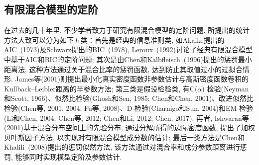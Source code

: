 \documentclass[a4paper,12pt,openany,oneside,utf-8]{ctexbook}
\begin{document}
\subsection{有限混合模型的定阶}
在过去的几十年里, 不少学者致力于研究有限混合模型的定阶问题. 所提出的统计方法大致可以分为如下五类：首先是经典的信息准则类, 如Akaike提出的AIC~(1973)及Schwarz提出的BIC~(1978), Leroux~(1992)讨论了经典有限混合模型中基于AIC和BIC的定阶问题; 其次是由Chen和Kalbfleisch~(1996)提出的惩罚最小距离法, 这种方法通过关于混合比率的惩罚函数, 达到防止其取值过小的过拟合情形. James等(2001)则提出最小化真实密度函数非参数估计与高斯密度函数卷积的Kullback–Leibler距离的半参数方法; 第三类是假设检验类, 有C($\alpha$) 检验(Neyman和Scott, 1966)、似然比检验(Ghosh和Sen, 1985; Chen和Chen, 2001)、改进似然比检验(Chen等, 2001, 2004; Fu等, 2008)、D-检验(Charnigo和Sun, 2004)和EM-检验(Li和Chen, 2004; Chen等, 2012; Chen和Li, 2012; Chen, 2017); 再者, Ishwaran等(2001)基于混合分布空间上的先验分布, 通过分解所得的边际密度函数, 提出了加权贝叶斯因子方法, 以实现对有限混合模型成分数的估计; 最后一类方法是Chen和Khalili~(2008)提出的惩罚似然方法, 该方法通过对混合率和成分参数距离进行惩罚, 能够同时实现模型定阶及参数估计. 
\end{document}
